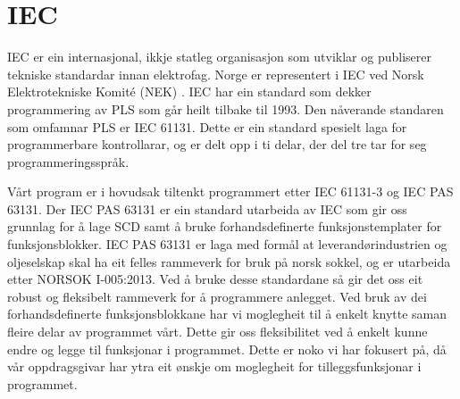 \section{IEC}
\thispagestyle{fancy}
\label{sec:5.2}


\gls{IEC} \citep{IEC} er ein internasjonal, ikkje statleg organisasjon som utviklar og publiserer tekniske standardar innan elektrofag. 
Norge er representert i \gls{IEC} ved Norsk Elektrotekniske Komité (\gls{NEK}) \citep{IEC-SNL}. 
\gls{IEC} har ein standard som dekker programmering av \gls{PLS} som går heilt tilbake til 1993\citep{Wiki-93}. 
Den nåverande standaren som omfamnar PLS er IEC 61131\citep{IEC-61131}. Dette er ein standard spesielt laga for programmerbare kontrollarar, og er delt opp i ti delar, der del tre tar for seg programmeringsspråk. 

Vårt program er i hovudsak tiltenkt programmert etter \gls{IEC} 61131-3 og \gls{IEC} \gls{PAS} 63131\citep{IEC-63131}. 
Der \gls{IEC} \gls{PAS} 63131 er ein standard utarbeida av \gls{IEC} som gir oss grunnlag for å lage \gls{SCD} samt å bruke forhandsdefinerte funksjonstemplater for funksjonsblokker. 
\gls{IEC} \gls{PAS} 63131 er laga med formål at leverandørindustrien og oljeselskap skal ha eit felles rammeverk for bruk på norsk sokkel, og er utarbeida etter NORSOK I-005:2013.
Ved å bruke desse standardane så gir det oss eit robust og fleksibelt rammeverk for å programmere anlegget. 
Ved bruk av dei forhandsdefinerte funksjonsblokkane har vi moglegheit til å enkelt knytte saman fleire delar av programmet vårt. 
Dette gir oss fleksibilitet ved å enkelt kunne endre og legge til funksjonar i programmet. 
Dette er noko vi har fokusert på, då vår oppdragsgivar har ytra eit ønskje om moglegheit for tilleggsfunksjonar i programmet. 
\newpage

